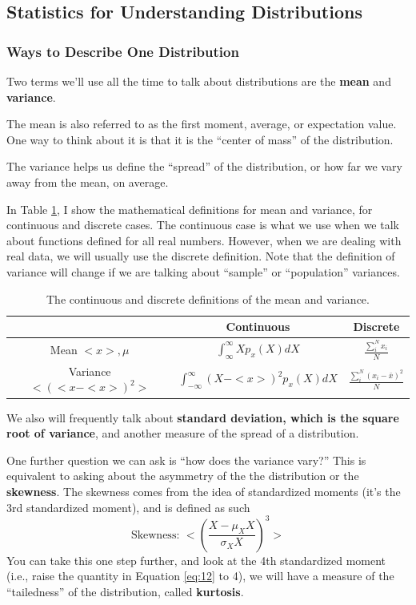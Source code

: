 \documentclass{article}
\begin{document}
\subsection{Statistics for Understanding Distributions}
\subsubsection{Ways to Describe One Distribution}
Two terms we'll use all the time to talk about distributions are the \textbf{mean} and \textbf{variance}.

The mean is also referred to as the first moment, average, or expectation value. One way to think about it is that it is the ``center of mass'' of the distribution.

The variance helps us define the ``spread'' of the distribution, or how far we vary away from the mean, on average.

In Table \ref{table:1}, I show the mathematical definitions for mean and variance, for continuous and discrete cases. The continuous case is what we use when we talk about functions defined for all real numbers. However, when we are dealing with real data, we will usually use the discrete definition. Note that the definition of variance will change if we are talking about ``sample'' or ``population'' variances. 

\begin{table}[h!]
  \centering
  \begin{tabular}{|c||c|c|}
    
    \hline
    & Continuous & Discrete \\
    \hline
    Mean $<x>, \mu$ & $\int^\infty_\infty X p_x(X)dX$ & $\frac{\sum_i^N x_i}{N}$ \\[0.75ex] 
    \hline
    Variance $<(<x-<x>)^2>$ & $\int^{\infty}_{-\infty}(X - <x>)^2 p_x(X) dX$ & $\frac{\sum_i^{N} (x_i-\bar{x})^2}{N}$\\[0.75ex]
    \hline
  \end{tabular}
  
  \caption{The continuous and discrete definitions of the mean and variance.}
  \label{table:1}
\end{table}

We also will frequently talk about \textbf{standard deviation, which is the square root of variance}, and another measure of the spread of a distribution.

One further question we can ask is ``how does the variance vary?'' This is equivalent to asking about the asymmetry of the the distribution or the \textbf{skewness}. The skewness comes from the idea of standardized moments (it's the 3rd standardized moment), and is defined as such
\begin{equation}
\label{eq:12}
\text{Skewness: } <\left(\frac{X - \mu_XX}{\sigma_XX}\right)^{3}>
\end{equation}
You can take this one step further, and look at the 4th standardized moment (i.e., raise the quantity in Equation \ref{eq:12} to 4), we will have a measure of the ``tailedness'' of the distribution, called \textbf{kurtosis}.
\end{document}
